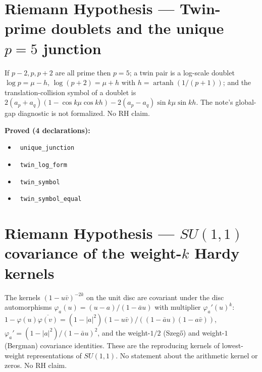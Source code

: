 \documentclass{report}
\theoremstyle{definition}
\begin{document}
\section{Riemann Hypothesis --- Twin-prime doublets and the unique $p=5$ junction}
If $p-2,p,p+2$ are all prime then $p=5$; a twin pair is a log-scale doublet $\log p=\mu-h$, $\log(p+2)=\mu+h$ with $h=\operatorname{artanh}(1/(p+1))$; and the translation-collision symbol of a doublet is $2(a_p+a_q)(1-\cos k\mu\cos kh)-2(a_p-a_q)\sin k\mu\sin kh$. The note's global-gap diagnostic is not formalized. No RH claim.

\noindent\textbf{Proved (4 declarations):}
\begin{itemize}
  \item {}\leanok\ \texttt{unique\_junction}
  \item {}\leanok\ \texttt{twin\_log\_form}
  \item {}\leanok\ \texttt{twin\_symbol}
  \item {}\leanok\ \texttt{twin\_symbol\_equal}
\end{itemize}

\section{Riemann Hypothesis --- $SU(1,1)$ covariance of the weight-$k$ Hardy kernels}
The kernels $(1-u\bar v)^{-2k}$ on the unit disc are covariant under the disc automorphisms $\varphi_a(u)=(u-a)/(1-\bar a u)$ with multiplier $\varphi_a'(u)^k$: $1-\varphi(u)\overline{\varphi(v)}=(1-|a|^2)(1-u\bar v)/((1-\bar au)(1-a\bar v))$, $\varphi_a'=(1-|a|^2)/(1-\bar au)^2$, and the weight-$1/2$ (Szeg\H{o}) and weight-$1$ (Bergman) covariance identities. These are the reproducing kernels of lowest-weight representations of $SU(1,1)$. No statement about the arithmetic kernel or zeros. No RH claim.
\end{document}
